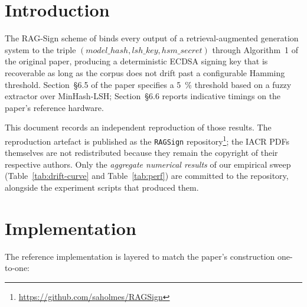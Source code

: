 \section{Introduction}
\label{sec:intro}

The RAG\nobreakdash-Sign scheme of \cite{holmes2025ragsign} binds every
output of a retrieval\nobreakdash-augmented generation system to the
triple $(\mathit{model\_hash}, \mathit{lsh\_key}, \mathit{hsm\_secret})$
through Algorithm~1 of the original paper, producing a deterministic
ECDSA signing key that is recoverable as long as the corpus does not
drift past a configurable Hamming threshold.  Section~\S6.5 of the
paper specifies a \SI{5}{\percent} threshold based on a fuzzy
extractor over MinHash\nobreakdash-LSH; Section~\S6.6 reports
indicative timings on the paper's reference hardware.

This document records an independent reproduction of those results.
The reproduction artefact is published as the \texttt{RAGSign}
repository\footnote{\url{https://github.com/saholmes/RAGSign}};
the IACR PDFs themselves are not redistributed because they remain the
copyright of their respective authors.  Only the \emph{aggregate
numerical results} of our empirical sweep
(Table~\ref{tab:drift-curve} and Table~\ref{tab:perf}) are committed
to the repository, alongside the experiment scripts that produced
them.

\section{Implementation}
\label{sec:implementation}

The reference implementation is layered to match the paper's
construction one\nobreakdash-to\nobreakdash-one:

